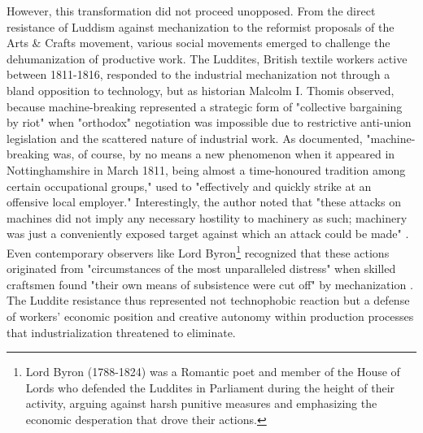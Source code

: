 However, this transformation did not proceed unopposed. From the direct resistance of Luddism against mechanization to the reformist proposals of the Arts \& Crafts movement, various social movements emerged to challenge the dehumanization of productive work. The Luddites, British textile workers active between 1811-1816, responded to the industrial mechanization not through a bland opposition to technology, but as historian Malcolm I. Thomis observed, because machine-breaking represented a strategic form of "collective bargaining by riot" \citep{thomis1993} when "orthodox" negotiation was impossible due to restrictive anti-union legislation and the scattered nature of industrial work. As \citet{thomis1993} documented, "machine-breaking was, of course, by no means a new phenomenon when it appeared in Nottinghamshire in March 1811, being almost a time-honoured tradition among certain occupational groups," used to "effectively and quickly strike at an offensive local employer." Interestingly, the author noted that "these attacks on machines did not imply any necessary hostility to machinery as such; machinery was just a conveniently exposed target against which an attack could be made" \citep{thomis1993}. Even contemporary observers like Lord Byron\footnote{Lord Byron (1788-1824) was a Romantic poet and member of the House of Lords who defended the Luddites in Parliament during the height of their activity, arguing against harsh punitive measures and emphasizing the economic desperation that drove their actions.} recognized that these actions originated from "circumstances of the most unparalleled distress" when skilled craftsmen found "their own means of subsistence were cut off" by mechanization \citep{byron1816}. The Luddite resistance thus represented not technophobic reaction but a defense of workers' economic position and creative autonomy within production processes that industrialization threatened to eliminate.

